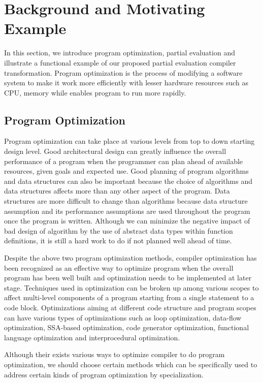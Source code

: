 \section{Background and Motivating Example}
\label{sec:background}

In this section, we introduce program optimization, partial evaluation and illustrate a functional example of our proposed partial evaluation compiler transformation.
Program optimization is the process of modifying a software system to make it work more efficiently with lesser hardware resources such as CPU, memory while enables program to run more rapidly.

\subsection{Program Optimization}
Program optimization can take place at various levels from top to down starting design level. Good architectural design can greatly influence the overall performance of a program when the programmer can plan ahead of available resources, given goals and expected use.
Good planning of program algorithms and data structures can also be important because the choice of algorithms and data structures affects more than any other aspect of the program. Data structures are more difficult to change than algorithms because data structure assumption and its performance assumptions are used throughout the program once the program is written. Although we can minimize the negative impact of bad design of algorithm by the use of abstract data types within function definitions, it is still a hard work to do if not planned well ahead of time. 

Despite the above two program optimization methods, compiler optimization has been recognized as an effective way to optimize program when the overall program has been well built and optimization needs to be implemented at later stage. 
Techniques used in optimization can be broken up among various scopes to affect multi-level components of a program starting from a single statement to a code block. 
Optimizations aiming at different code structure and program scopes can have various types of optimizations such as loop optimization, data-flow optimization, SSA-based optimization, code generator optimization, functional language optimization and interprocedural optimization. 

Although their exists various ways to optimize compiler to do program optimization, we should choose certain methods which can be specifically used to address certain kinds of program optimization by specialization. 

